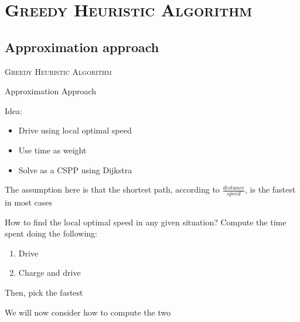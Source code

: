 \section{\scshape Greedy Heuristic Algorithm}

\subsection{Approximation approach}

\begin{frame}
\center \huge \scshape Greedy Heuristic Algorithm
\end{frame}

\begin{frame}{Approximation Approach}

  Idea:
  \begin{itemize}
    \item Drive using local optimal speed
    \item Use time as weight
    \item Solve as a CSPP using Dijkstra
  \end{itemize}
  The assumption here is that the shortest path, according to $\frac{distance}{speed}$, is the fastest in most cases
\end{frame}

\begin{frame}
  How to find the local optimal speed in any given situation?
  Compute the time spent doing the following:
  \begin{enumerate}
    \item Drive
    \item Charge and drive
  \end{enumerate}
  Then, pick the fastest

  We will now consider how to compute the two

\end{frame}
